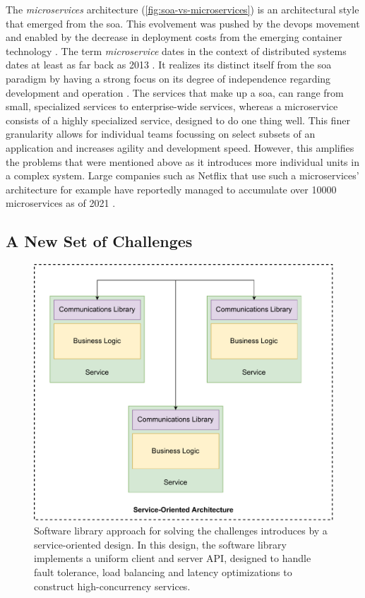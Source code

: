 The \textit{microservices} architecture (\cref{fig:soa-vs-microservices}) is an architectural style that emerged from the \gls{soa}. This evolvement was pushed by the  \gls{devops} movement and enabled by the decrease in deployment costs from the emerging \gls{container} technology \cite{amaral2015performance}.  The term \textit{microservice} dates in the context of distributed systems dates at least as far back as 2013 \cite{fowler-microservices}. It realizes its distinct itself from the \gls{soa}  paradigm by having a strong focus on its degree of independence regarding development and operation \cite{ibm-soa-vs-microservices}. The services that make up a \gls{soa}, can range from small, specialized services to enterprise-wide services, whereas a microservice consists of a highly specialized service, designed to do one thing well. This finer granularity allows for individual teams focussing on select subsets of an application and increases agility and development speed. However, this amplifies the problems that were mentioned above as it introduces more individual units in a complex system. Large companies such as Netflix that use such a microservices' architecture for example have reportedly managed to accumulate over 10000 microservices as of 2021 \cite{netflix-chaos, netflix-svc}.



\subsection{A New Set of Challenges}
\label{sec:background:soa:challenges}



\begin{figure}[!t]
    \centering
    
    \includegraphics[width=.7\linewidth]{2_background/figures/software-lib-approach.pdf}

    \caption{Software library approach for solving the challenges introduces by a service-oriented design. In this design, the software library implements a uniform client and server API, designed to  handle fault tolerance, load balancing and latency optimizations to construct high-concurrency services.}
    \label{fig:software-lib-approach}
\end{figure}

